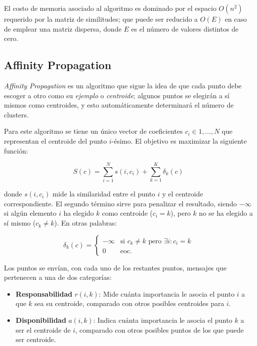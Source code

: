 El costo de memoria asociado al algoritmo es dominado por el espacio $O(n^2)$ requerido por la matriz de similitudes;
que puede ser reducido a $O(E)$ en caso de emplear una matriz dispersa, donde $E$ es el número de valores distintos de cero.

\subsection{Affinity Propagation}\label{subsec:affinityPropagation}

\textit{Affinity Propagation} es un algoritmo que sigue la idea de que cada punto debe escoger a otro como su \textit{ejemplo} o \textit{centroide};
algunos puntos se elegirán a sí mismos como centroides, y esto automáticamente determinará el número de clusters.

Para este algoritmo se tiene un único vector de coeficientes $c_i \in {1,\dots,N}$ que representan el centroide del punto $i$-ésimo.
El objetivo es maximizar la siguiente función:

\begin{equation}
    \label{eq:affinity-propagation}
    S(c) = \sum_{i=1}^{N}s(i,c_i) + \sum_{k=1}^{K}{\delta_k(c)}
\end{equation}

\noindent
donde $s(i, c_i)$ mide la similaridad entre el punto $i$ y el centroide correspondiente.
El segundo término sirve para penalizar el resultado, siendo $-\infty$ si algún elemento $i$ ha elegido $k$ como centroide ($c_i = k$), pero $k$ no se ha elegido a sí mismo ($c_k \neq k$).
En otras palabras:

\begin{equation}
    \label{affinity-propagation-penalty}
    \delta_k(c) = \begin{cases}
                      -\infty & \text{si $c_k \neq k$ pero $\exists i: c_i = k$} \\
                      0 & \text{eoc.}
    \end{cases}
\end{equation}

Los puntos se envían, con cada uno de los restantes puntos, mensajes que pertenecen a una de dos categorías:
\begin{itemize}
    \item \textbf{Responsabilidad} $r(i, k)$: Mide cuánta importancia le asocia el punto $i$ a que $k$ sea su centroide, comparado con otros posibles centroides para $i$.
    \item \textbf{Disponibilidad} $a(i, k)$: Indica cuánta importancia le asocia el punto $k$ a ser el centroide de $i$, comparado con otros posibles puntos de los que puede ser centroide.
\end{itemize}

